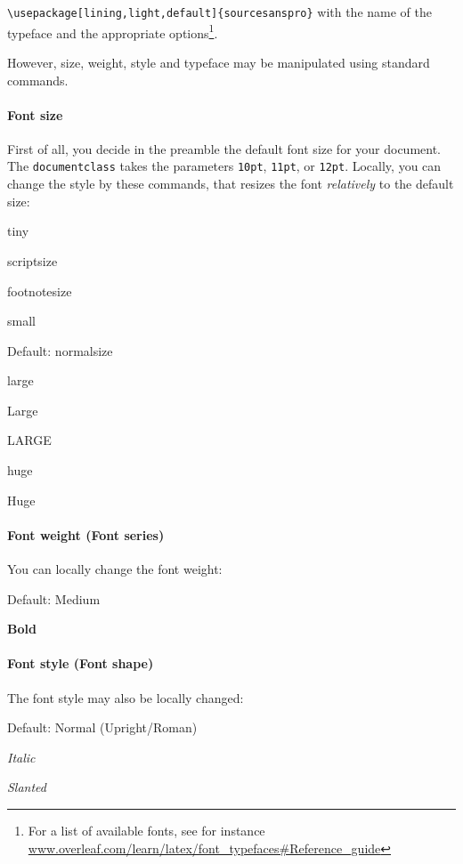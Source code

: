 \verb|\usepackage[lining,light,default]{sourcesanspro}|
with the name of the typeface and the appropriate options\footnote{For a list of available fonts, see for instance \url{www.overleaf.com/learn/latex/font_typefaces\#Reference_guide}}.

However, size, weight, style and typeface may be manipulated using standard commands.

\paragraph{Font size}

First of all, you decide in the preamble the default font size for your document. The \texttt{documentclass} takes the parameters \texttt{10pt},  \texttt{11pt},  or \texttt{12pt}. Locally, you can change the style by these commands, that resizes the font {\em relatively} to the default size:

    \tiny tiny
    
    \scriptsize scriptsize
    
    \footnotesize footnotesize
    
    \small small
    
    \normalsize Default: normalsize
    
    \large  large
    
    \Large Large
    
    \LARGE LARGE
    
    \huge huge
    
    \Huge  Huge
    
    \normalsize 
    
\paragraph{Font weight (Font series)}
You can locally change the font weight:
    
    \textmd{Default: Medium}
    
    \textbf{Bold}
    
    
\paragraph{Font style (Font shape)}
The font style may also be locally changed:
    
    \textup{Default: Normal (Upright/Roman)}
    
    \textit{Italic}
    
    \textsl{Slanted}
    
